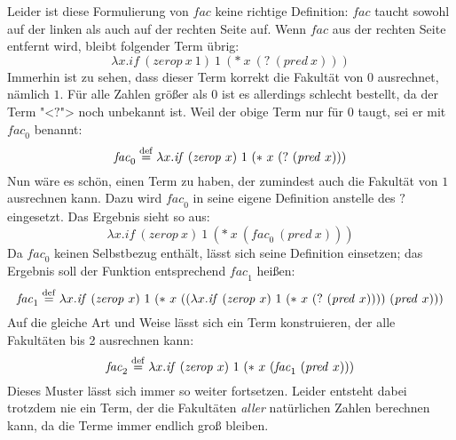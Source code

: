 Leider ist diese Formulierung von $\mathit{fac}$ keine richtige
Definition: $\mathit{fac}$ taucht sowohl auf der linken
als auch auf der rechten Seite auf.  Wenn $\mathit{fac}$ aus der
rechten Seite entfernt wird, bleibt folgender Term übrig:
%
\begin{displaymath}
  \lambda x.\mathit{if}~(\mathit{zerop}~x~1)~1~(\ast~x~(?~(\mathit{pred}~x)))
\end{displaymath}
%
Immerhin ist zu sehen, dass dieser Term korrekt die Fakultät von $0$
ausrechnet, nämlich $1$.  Für alle Zahlen größer als $0$ ist es allerdings
schlecht bestellt, da der Term "<$?$"> noch unbekannt ist.
Weil der obige Term nur für $0$ taugt, sei er mit $\mathit{fac}_0$
benannt:
%
\begin{displaymath}
  \mathit{fac}_0 \stackrel{\rm def}{=} \lambda x.\mathit{if}~(\mathit{zerop}~x)~1~(\ast~x~(?~(\mathit{pred}~x)))
\end{displaymath}
%
Nun wäre es schön, einen Term zu haben, der zumindest auch die
Fakultät von $1$ ausrechnen kann.  Dazu wird $\mathit{fac}_0$ in
seine eigene Definition anstelle des $?$ eingesetzt.  Das Ergebnis
sieht so aus:
%
\begin{displaymath}
  \lambda x.\mathit{if}~(\mathit{zerop}~x)~1~(\ast~x~(\mathit{fac}_0~(\mathit{pred}~x)))
\end{displaymath}
%
Da $\mathit{fac}_0$ keinen Selbstbezug enthält, lässt sich seine
Definition einsetzen; das Ergebnis soll der Funktion entsprechend
$\mathit{fac}_1$ heißen:
%
\begin{displaymath}
  \mathit{fac}_1 \stackrel{\rm def}{=}{} \lambda x.\mathit{if}~(\mathit{zerop}~x)~1~(\ast~x~((\lambda x.\mathit{if}~(\mathit{zerop}~x)~1~(\ast~x~(?~(\mathit{pred}~x))))~(\mathit{pred}~x)))
\end{displaymath}
%
Auf die gleiche Art und Weise lässt sich ein Term konstruieren, der
alle Fakultäten bis 2 ausrechnen kann:
%
\begin{displaymath}
  \mathit{fac}_2 \stackrel{\rm def}{=}{} \lambda x.\mathit{if}~(\mathit{zerop}~x)~1~(\ast~x~(\mathit{fac}_1~(\mathit{pred}~x)))
\end{displaymath}
%
Dieses Muster lässt sich immer so weiter fortsetzen.  Leider entsteht
dabei trotzdem nie ein Term, der die Fakultäten \emph{aller}
natürlichen Zahlen berechnen kann, da die Terme immer endlich groß
bleiben.

